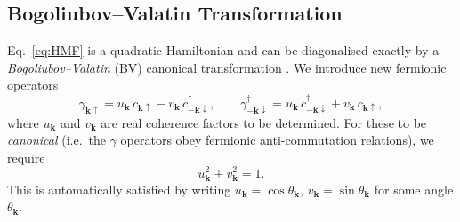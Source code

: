 \subsection{Bogoliubov--Valatin Transformation}

Eq.~\eqref{eq:HMF} is a quadratic Hamiltonian and can be diagonalised exactly
by a \emph{Bogoliubov--Valatin} (BV) canonical transformation
\cite{Bogoliubov1958,Valatin1958}. We introduce new fermionic operators
\begin{equation}
	\gamma_{\mathbf{k}\uparrow} = u_{\mathbf{k}}\, c_{\mathbf{k}\uparrow}
	- v_{\mathbf{k}}\, c^\dagger_{-\mathbf{k}\downarrow}, \qquad
	\gamma^\dagger_{-\mathbf{k}\downarrow} = u_{\mathbf{k}}\,
	c^\dagger_{-\mathbf{k}\downarrow} + v_{\mathbf{k}}\, c_{\mathbf{k}\uparrow},
	\label{eq:BV_transform}
\end{equation}
where $u_{\mathbf{k}}$ and $v_{\mathbf{k}}$ are real coherence factors to be
determined. For these to be \emph{canonical} (i.e.\ the $\gamma$ operators obey
fermionic anti-commutation relations), we require
\begin{equation}
	u_{\mathbf{k}}^2 + v_{\mathbf{k}}^2 = 1.
	\label{eq:uv_normalisation}
\end{equation}
This is automatically satisfied by writing $u_{\mathbf{k}} = \cos\theta_{\mathbf{k}}$,
$v_{\mathbf{k}} = \sin\theta_{\mathbf{k}}$ for some angle $\theta_{\mathbf{k}}$.

